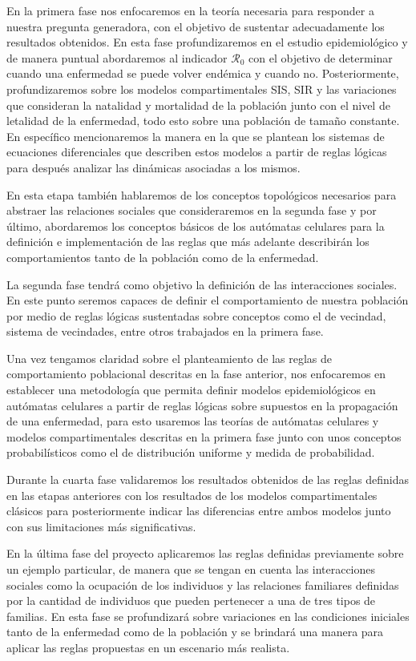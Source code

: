 En la primera fase nos enfocaremos en la teoría necesaria para responder a nuestra pregunta generadora, con el objetivo de sustentar adecuadamente los resultados obtenidos. En esta fase profundizaremos en el estudio epidemiológico y de manera puntual abordaremos al indicador $\mathcal{R}_0$ con el objetivo de determinar cuando una enfermedad se puede volver endémica y cuando no. Posteriormente, profundizaremos sobre los modelos compartimentales SIS, SIR y las variaciones que consideran la natalidad y mortalidad de la población junto con el nivel de letalidad de la enfermedad, todo esto sobre una población de tamaño constante. En específico mencionaremos la manera en la que se plantean los sistemas de ecuaciones diferenciales que describen estos modelos a partir de reglas lógicas para después analizar las dinámicas asociadas a los mismos.

En esta etapa también hablaremos de los conceptos topológicos necesarios para abstraer las relaciones sociales que consideraremos en la segunda fase y por último, abordaremos los conceptos básicos de los autómatas celulares para la definición e implementación de las reglas que más adelante describirán los comportamientos tanto de la población como de la enfermedad.
    
La segunda fase tendrá como objetivo la definición de las interacciones sociales. En este punto seremos capaces de definir el comportamiento de nuestra población por medio de reglas lógicas sustentadas sobre conceptos como el de vecindad, sistema de vecindades, entre otros trabajados en la primera fase.
    
Una vez tengamos claridad sobre el planteamiento de las reglas de comportamiento poblacional descritas en la fase anterior, nos enfocaremos en establecer una metodología que permita definir modelos epidemiológicos en autómatas celulares a partir de reglas lógicas sobre supuestos en la propagación de una enfermedad, para esto usaremos las teorías de autómatas celulares y modelos compartimentales descritas en la primera fase junto con unos conceptos probabilísticos como el de distribución uniforme y medida de probabilidad. 
    
Durante la cuarta fase validaremos los resultados obtenidos de las reglas definidas en las etapas anteriores con los resultados de los modelos compartimentales clásicos para posteriormente indicar las diferencias entre ambos modelos junto con sus limitaciones más significativas.
    
En la última fase del proyecto aplicaremos las reglas definidas previamente sobre un ejemplo particular, de manera que se tengan en cuenta las interacciones sociales como la ocupación de los individuos y las relaciones familiares definidas por la cantidad de individuos que pueden pertenecer a una de tres tipos de familias. En esta fase se profundizará sobre variaciones en las condiciones iniciales tanto de la enfermedad como de la población y se brindará una manera para aplicar las reglas propuestas en un escenario más realista.

